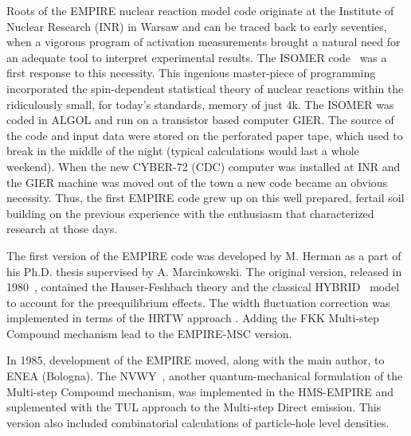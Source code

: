 \documentclass[twocolumn,amsmath,amssymb,10pt,groupedaddress,letter]{revtex4}
\begin{document}
Roots of the EMPIRE nuclear reaction model code originate at the Institute of Nuclear Research (INR) in Warsaw and can be traced back to early seventies, when a vigorous program of activation measurements brought a natural need for an adequate  tool to interpret experimental results. The ISOMER code~\cite{Grochulski:73} was a first response to this necessity. This ingenious master-piece of programming incorporated the spin-dependent statistical theory of nuclear reactions within the ridiculously small, for today's standards, memory of just 4k. The ISOMER was coded in ALGOL and run on a transistor based computer GIER. The source of the code and input data were stored on the perforated paper tape, which used to break in the middle of the night (typical calculations would last a whole weekend). When the new CYBER-72 (CDC) computer was installed at INR and the GIER machine was moved out of the town a new code became an obvious necessity. Thus, the first EMPIRE code grew up on this well prepared, fertail soil building on the previous experience with the enthusiasm that characterized research at those days.

The first version of the EMPIRE code was developed by M. Herman as a part of his Ph.D. thesis supervised by A. Marcinkowski. The original version, released in 1980~\cite{EMPIRE-I},
contained the Hauser-Feshbach theory and the
classical HYBRID~\cite{hybrid, hybrid1, hybrid2, hybrid3} model to account for the preequilibrium
effects. The width fluctuation correction was implemented in terms
of the HRTW approach \cite{HRTW,HHM}. Adding the FKK Multi-step Compound
mechanism \cite{FKK} lead to the EMPIRE-MSC version.

In 1985, development of the EMPIRE moved, along with the main author, to ENEA (Bologna).
The NVWY~\cite{NVWY}, another quantum-mechanical formulation of the Multi-step Compound mechanism,
was implemented in the HMS-EMPIRE and suplemented with the TUL approach\cite{TUL} to the Multi-step Direct emission. This version also
included combinatorial calculations of particle-hole level densities.
\end{document}
